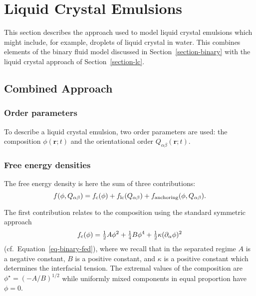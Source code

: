 %
%
%
%
%
%


\section{Liquid Crystal Emulsions}

This section describes the approach used to model liquid crystal
emulsions which might include, for example, droplets of liquid
crystal in water. This combines elements of the binary fluid model
discussed in Section~\ref{section-binary} with the liquid crystal
approach of Section~\ref{section-lc}. 

\subsection{Combined Approach}

\subsubsection{Order parameters}

To describe a liquid crystal emulsion, two order parameters are used:
the composition $\phi({\mathbf r}; t)$ and the orientational order
$Q_{\alpha\beta}({\mathbf r}; t)$.


\subsubsection{Free energy densities}

The free energy density is here the sum of three contributions:
\begin{equation}
f(\phi, Q_{\alpha\beta}) = f_{\rm c}(\phi) + f_{\rm lc}(Q_{\alpha\beta})
                         + f_{\rm anchoring}(\phi, Q_{\alpha\beta}).
\end{equation}

The first contribution relates to the composition using the standard
symmetric approach
\begin{equation}
f_{\rm c}(\phi) =
 {\textstyle\frac{1}{2}}A\phi^2
+ {\textstyle\frac{1}{4}}B\phi^4
+ {\textstyle\frac{1}{2}}\kappa (\partial_\alpha \phi)^2
\end{equation}
(cf.\ Equation~\ref{eq-binary-fed}),
where we recall that in the separated regime $A$ is a negative constant,
$B$ is a positive constant, and $\kappa$ is a positive constant which
determines the interfacial tension. The extremal values of the
composition are $\phi^\star = (-A/B)^{1/2}$ while
uniformly mixed components in equal proportion have $\phi = 0$.

